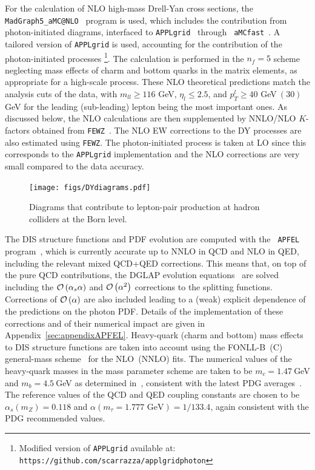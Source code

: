 For the calculation of NLO high-mass Drell-Yan cross sections, the
{\tt MadGraph5{\_}aMC@\-NLO}~\cite{Alwall:2014hca} program is used, which
includes the contribution from photon-initiated diagrams, interfaced
to {\tt APPLgrid}~\cite{Carli:2010rw} through {\tt
  aMCfast}~\cite{amcfast}.
%
A tailored version of {\tt APPLgrid} is used, accounting for
the contribution of the photon-initiated processes \footnote{Modified version of {\tt APPLgrid} available at: {\tt https://github.com/scarrazza/applgridphoton}}.
%
The calculation is performed in the $n_f=5$ scheme neglecting mass
effects of charm and bottom quarks in the matrix elements, as
appropriate for a high-scale process.
%
These NLO theoretical predictions match the  
analysis cuts of the data, with $m_{ll}\ge 116$ GeV, $\eta_l\le 2.5$, and
$p_T^l \ge 40$ GeV$~(30)$ GeV for the leading (sub-leading) lepton being
the most important ones.
%
As discussed below, the NLO calculations are then supplemented by
NNLO/NLO $K$-factors obtained from {\tt FEWZ}~\cite{Gavin:2012sy}.
%
The NLO EW corrections to the DY processes are also estimated
using {\tt FEWZ}. 
%
The photon-initiated process is taken at LO since this corresponds to
the {\tt APPLgrid} implementation and the NLO corrections are
very small compared to the data accuracy.
%

\begin{figure}[t]
  \begin{center}
    \texttt{[image: figs/DYdiagrams.pdf]}
    \end{center}
    \caption{Diagrams that contribute to lepton-pair production at
      hadron colliders at the Born level.}
\label{fig:photoninduced}
\end{figure}

The DIS structure functions and PDF evolution are computed with the {\tt
  APFEL} program~\cite{Bertone:2013vaa}, which is currently accurate
up to NNLO in QCD and NLO in QED, including the relevant mixed
QCD+QED corrections.
%
This means that, on top of the pure QCD
contributions, the DGLAP evolution
equations~\cite{Gribov:1972ri,Dokshitzer:1977,Altarelli:1977zs} are
solved including the $\mathcal{O}\left( \alpha_s\alpha\right)$ and
$\mathcal{O}\left( \alpha^2\right)$ corrections to the splitting functions.
%
Corrections of $\mathcal{O}\left( \alpha\right)$ are also included leading to a (weak)
explicit dependence of the predictions on the photon PDF.
%
Details
of the implementation of these corrections and of their numerical
impact are given in Appendix~\ref{sec:appendixAPFEL}.
%
Heavy-quark (charm and bottom) mass effects to DIS structure functions
are taken into account using the FONLL-B~(C) general-mass
scheme~\cite{Forte:2010ta} for the NLO~(NNLO) fits.
%
The numerical values of the heavy-quark masses in the mass parameter 
scheme
are taken to be $m_c=1.47~$GeV and $m_b=4.5~$GeV as determined in~\cite{Abramowicz:2015mha},  
consistent with the latest PDG averages~\cite{Agashe:2014kda}.
%
The reference values of the QCD and QED coupling constants are chosen to be
$\alpha_s(m_Z)=0.118$ and $\alpha(m_\tau=1.777\mbox{ GeV})=1/133.4$, again consistent
with the PDG recommended values.

